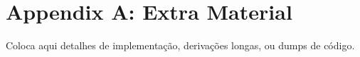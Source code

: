 \section{Appendix A: Extra Material}
\label{apx:extra}

Coloca aqui detalhes de implementação, derivações longas, ou dumps de código.
